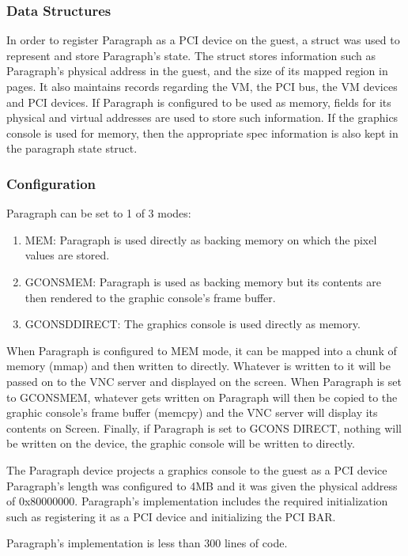 \documentclass{acm_proc_article-sp}
\begin{document}
\subsubsection{Data Structures}
In order to register Paragraph as a PCI device on the guest, a struct was used
to represent and store Paragraph's state. The struct stores information such as
Paragraph's physical address in the guest, and the size of its mapped region in
pages. It also maintains records regarding the VM, the PCI bus, the VM devices and PCI
devices. If Paragraph is configured to be used as memory, fields for its
physical and virtual addresses are used to store such information. If the
graphics console is used for memory, then the appropriate spec information is
also kept in the paragraph state struct. 
\subsubsection{Configuration}
Paragraph can be set to 1 of 3 modes: \\
\begin{enumerate}
\item MEM: Paragraph is used directly as backing memory on which the pixel values
are stored.
\item GCONS\textunderscore MEM: Paragraph is used as backing memory but its contents are
then rendered to the graphic console's frame buffer.
\item GCONSD\textunderscore DIRECT: The graphics console is used directly as memory.
\end{enumerate}
When Paragraph is configured to MEM mode, it can be mapped into a chunk of
memory (mmap) and then written to directly. Whatever is written to it will be
passed on to the VNC server and displayed on the screen. When Paragraph is set
to GCONS\textunderscore MEM, whatever gets written on Paragraph will then be
copied to the graphic console's frame buffer (memcpy) and the VNC server will
display its contents on Screen. Finally, if Paragraph is set to GCONS
\textunderscore DIRECT, nothing will be written on the device, the graphic
console will be written to directly.

The Paragraph device projects a graphics console to the guest as a PCI device
Paragraph's length was configured to 4MB and it was given the physical address
of 0x80000000. Paragraph's implementation includes the required initialization
such as registering it as a PCI device and initializing the PCI BAR. 

Paragraph's implementation is less than 300 lines of code.
\end{document}
